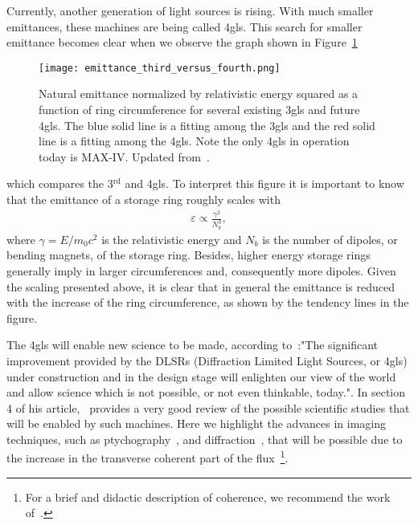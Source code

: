     Currently, another generation of light sources is rising. With much smaller emittances, these machines are being called \gls{4gls}.
    This search for smaller emittance becomes clear when we observe the graph shown in Figure~\ref{fig:scaled_emittances}
    \begin{figure}
        \center
        \texttt{[image: emittance\_third\_versus\_fourth.png]}
        \caption[Comparison of machines emittances.]{Natural emittance normalized by relativistic energy squared as a function of ring circumference for several existing \gls{3gls} and future \gls{4gls}. The blue solid line is a fitting among the \gls{3gls} and the red solid line is a fitting among the \gls{4gls}. Note the only \gls{4gls} in operation today is MAX-IV. Updated from~\cite{Liu2017}.}
        \label{fig:scaled_emittances}
    \end{figure}
    which compares the 3$^\text{rd}$ and \gls{4gls}. To interpret this figure it is important to know that the emittance of a storage ring roughly scales with
    \begin{align}
        \varepsilon \propto \frac{\gamma^2}{N_b^3},
    \end{align}
    where $\gamma = E/m_0c^2$ is the relativistic energy and $N_b$ is the number of dipoles, or bending magnets, of the storage ring. Besides, higher energy storage rings generally imply in larger circumferences and, consequently more dipoles. Given the scaling presented above, it is clear that in general the emittance is reduced with the increase of the ring circumference, as shown by the tendency lines in the figure.

    The \gls{4gls} will enable new science to be made, according to~:"The significant improvement provided by the DLSRs (Diffraction Limited Light Sources, or \gls{4gls}) under construction and in the design stage will enlighten our view of the world and allow science which is not possible, or not even thinkable, today.". In section 4 of his article,~ provides a very good review of the possible scientific studies that will be enabled by such machines. Here we highlight the advances in imaging techniques, such as ptychography~\cite{Thibault2014}, and diffraction~\cite{Hitchcock2014}, that will be possible due to the increase in the transverse coherent part of the flux~\footnote{For a brief and didactic description of coherence, we recommend the work of~.}.

